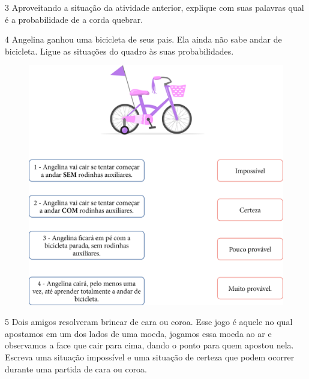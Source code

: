 \num{3} Aproveitando a situação da atividade anterior, explique com suas
palavras qual é a probabilidade de a corda quebrar.


\pagebreak
\num{4} Angelina ganhou uma bicicleta de seus pais. Ela ainda não sabe andar de
bicicleta. Ligue as situações do quadro às suas probabilidades.


\begin{figure}[htpb!]
\includegraphics[width=\textwidth]{./media/image87.png}
\end{figure}


\num{5} Dois amigos resolveram brincar de cara ou coroa. Esse jogo é aquele no
qual apostamos em um dos lados de uma moeda, jogamos essa moeda ao ar e observamos a face
que cair para cima, dando o ponto para quem apostou nela. Escreva uma
situação impossível e uma situação de certeza que podem ocorrer durante uma partida de cara ou coroa.


